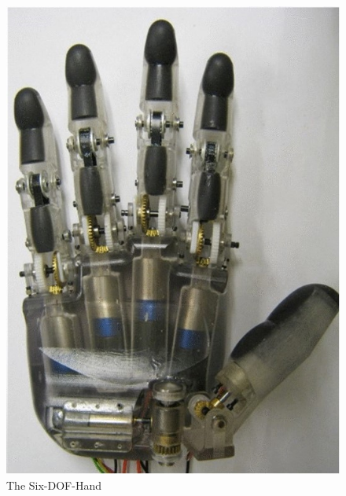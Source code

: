 \documentclass[a4paper, 10pt, conference]{ieeeconf}      %
\begin{document}
\begin{figure}[h]

	\centering
	\includegraphics[scale=0.32]{images/SixDoF}
	
	\caption{The Six-DOF-Hand}
\end{figure}
\end{document}
